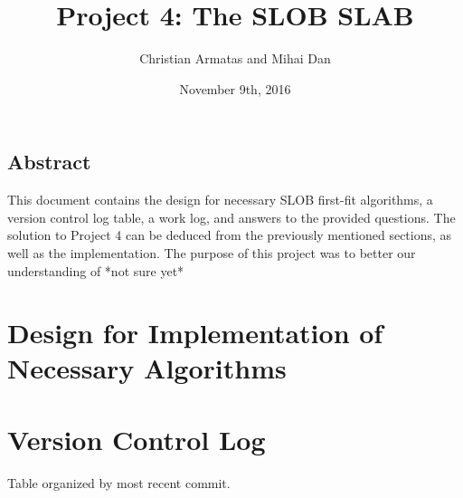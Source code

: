 \documentclass[letterpaper,10pt,onecolumn]{IEEEtran}
\title{Project 4: The SLOB SLAB}
\author{Christian Armatas and Mihai Dan}
\date{November 9th, 2016}
\begin{document}
    \begin{center}
        \begin{minipage}[h]{\textwidth}
            \maketitle
        \end{minipage}
    \end{center}
    
    \vspace{140mm}
    
    \begin{center}
        \section*{Abstract}
        This document contains the design for necessary SLOB first-fit algorithms, a version control log table, a work log, and answers to the provided questions. The solution to Project 4 can be deduced from the previously mentioned sections, as well as the implementation. The purpose of this project was to better our understanding of *not sure yet*
    \end{center}
    
    
    \newpage
    
    
    \section*{Design for Implementation of Necessary Algorithms}
  

    \vspace{6mm}
    
    
    \section*{Version Control Log}
        \begin{center}
            Table organized by most recent commit.
        \end{center}
        
        \vspace{0.5mm}
        
        \begin{center}
        \def\arraystretch{1.1}
        \begin{tabular}{ | p{8cm} | }
            \hline
            
            \hline
        \end{tabular}
        \end{center}
\end{document}
